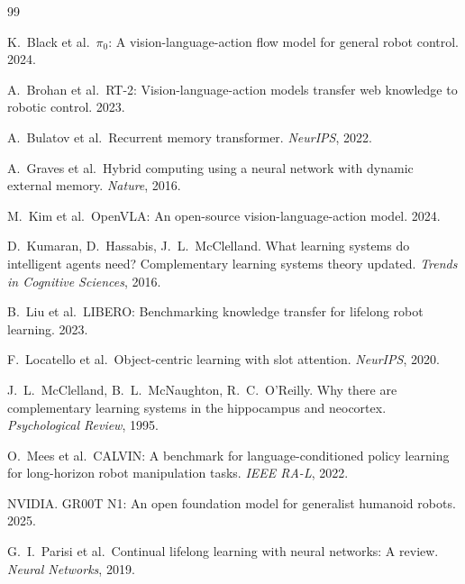 \documentclass[10pt,letterpaper,fontset=fandol]{ctexart}
\begin{document}
\small

\begin{thebibliography}{99}

K.~Black et al.\ \newblock $\pi_0$: A vision-language-action flow model for general robot control. 2024.

A.~Brohan et al.\ \newblock RT-2: Vision-language-action models transfer web knowledge to robotic control. 2023.

A.~Bulatov et al.\ \newblock Recurrent memory transformer. \emph{NeurIPS}, 2022.

A.~Graves et al.\ \newblock Hybrid computing using a neural network with dynamic external memory. \emph{Nature}, 2016.

M.~Kim et al.\ \newblock OpenVLA: An open-source vision-language-action model. 2024.

D.~Kumaran, D.~Hassabis, J.~L.~McClelland. \newblock What learning systems do intelligent agents need? Complementary learning systems theory updated. \emph{Trends in Cognitive Sciences}, 2016.

B.~Liu et al.\ \newblock LIBERO: Benchmarking knowledge transfer for lifelong robot learning. 2023.

F.~Locatello et al.\ \newblock Object-centric learning with slot attention. \emph{NeurIPS}, 2020.

J.~L.~McClelland, B.~L.~McNaughton, R.~C.~O'Reilly. \newblock Why there are complementary learning systems in the hippocampus and neocortex. \emph{Psychological Review}, 1995.

O.~Mees et al.\ \newblock CALVIN: A benchmark for language-conditioned policy learning for long-horizon robot manipulation tasks. \emph{IEEE RA-L}, 2022.

NVIDIA. \newblock GR00T N1: An open foundation model for generalist humanoid robots. 2025.

G.~I.~Parisi et al.\ \newblock Continual lifelong learning with neural networks: A review. \emph{Neural Networks}, 2019.


\end{thebibliography}
\end{document}
